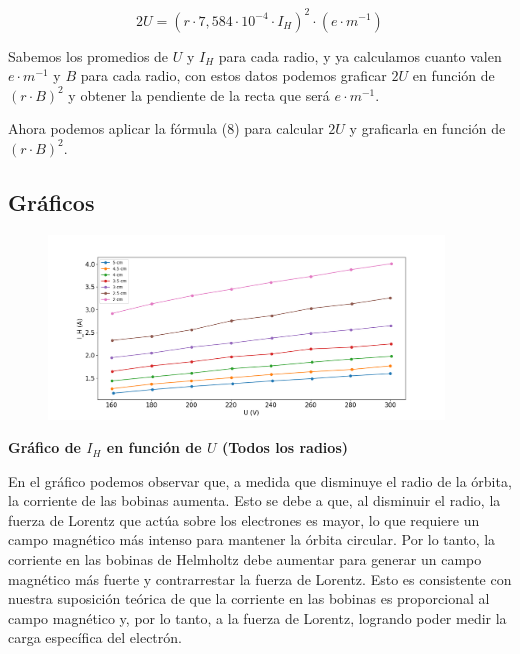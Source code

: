 \documentclass[a4paper]{article}
\begin{document}
    \begin{equation}
        2U = (r \cdot 7,584 \cdot 10^{-4} \cdot I_H)^2 \cdot (e \cdot m^{-1})
    \end{equation}

    \indent Sabemos los promedios de $U$ y $I_H$ para cada radio, y ya calculamos cuanto valen $e \cdot m^{-1}$ y $B$ para cada radio, con estos datos podemos graficar $2U$ en función de $(r \cdot B)^2$ y obtener la pendiente de la recta que será $e \cdot m^{-1}$.



    \indent Ahora podemos aplicar la fórmula (8) para calcular $2U$ y graficarla en función de $(r \cdot B)^2$. 
   
    \newpage
    \noindent
    \thispagestyle{fancy}
    
    \subsection{Gráficos}
    
    \begin{figure}[h!]
        \centering
        \includegraphics[width = 10.5cm] {../imagenes/graficoI_HyU.png}
    \end{figure}

    \begin{center}
        \textbf{Gráfico de $I_H$ en función de $U$ (Todos los radios)}
    \end{center}

    \indent En el gráfico podemos observar que, a medida que disminuye el radio de la órbita, la corriente de las bobinas aumenta. Esto se debe a que, al disminuir el radio, la fuerza de Lorentz que actúa sobre los electrones es mayor, lo que requiere un campo magnético más intenso para mantener la órbita circular. Por lo tanto, la corriente en las bobinas de Helmholtz debe aumentar para generar un campo magnético más fuerte y contrarrestar la fuerza de Lorentz. Esto es consistente con nuestra suposición teórica de que la corriente en las bobinas es proporcional al campo magnético y, por lo tanto, a la fuerza de Lorentz, logrando poder medir la carga específica del electrón.
\end{document}

